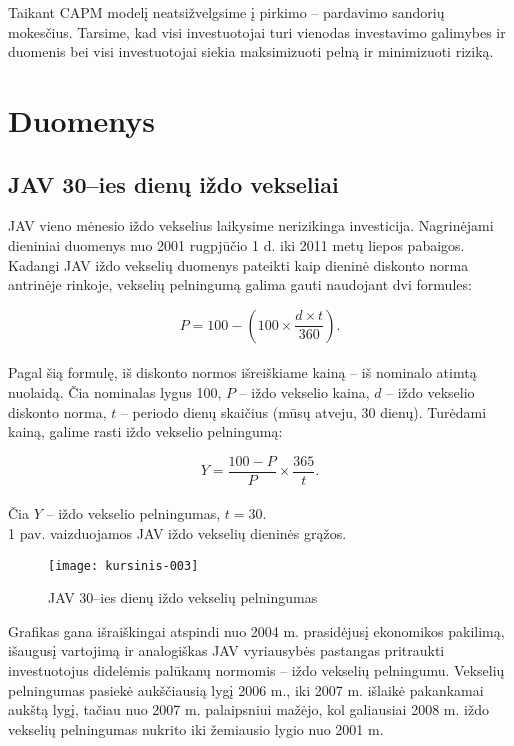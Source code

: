 \documentclass[12pt, a14paper, lithuanian]{article}
\begin{document}
Taikant CAPM modelį neatsižvelgsime į pirkimo -- pardavimo sandorių mokesčius. Tarsime, kad visi investuotojai turi vienodas investavimo galimybes ir duomenis bei visi investuotojai siekia maksimizuoti pelną ir minimizuoti riziką.



\newpage
\section{Duomenys}
\subsection{JAV 30--ies dienų iždo vekseliai}

JAV vieno mėnesio iždo vekselius laikysime nerizikinga investicija. Nagrinėjami dieniniai duomenys nuo 2001 rugpjūčio 1 d. iki 2011 metų liepos pabaigos\cite{tbills}.
Kadangi JAV iždo vekselių duomenys pateikti kaip dieninė diskonto norma antrinėje rinkoje, vekselių pelningumą galima gauti naudojant dvi formules:


$$P = 100 - \left( 100 \times \frac{d \times t}{360}\right) .$$\\

Pagal šią formulę, iš diskonto normos išreiškiame kainą -- iš nominalo atimtą nuolaidą. 
Čia nominalas lygus 100, $P$ -- iždo vekselio kaina, $d$ -- iždo vekselio diskonto norma,
$t$ -- periodo dienų skaičius (mūsų atveju, 30 dienų). 
Turėdami kainą, galime rasti iždo vekselio pelningumą:

$$Y = \frac{100 - P}{P} \times \frac{365}{t}.$$\\

Čia  $Y$ -- iždo vekselio pelningumas, $t = 30$. \\

1 pav. vaizduojamos JAV iždo vekselių dieninės grąžos.
   
\begin{figure}[H]
  \centering
\texttt{[image: kursinis-003]}
  \caption{JAV 30--ies dienų iždo vekselių pelningumas}
  \label{fig:1}
\end{figure}

Grafikas gana išraiškingai atspindi nuo 2004 m. prasidėjusį ekonomikos pakilimą, išaugusį vartojimą ir analogiškas
JAV vyriausybės pastangas pritraukti investuotojus didelėmis palūkanų normomis -- iždo vekselių pelningumu.
Vekselių pelningumas pasiekė aukščiausią lygį 2006 m., iki 2007 m. išlaikė pakankamai aukštą lygį, tačiau nuo 2007 m.
palaipsniui mažėjo, kol galiausiai 2008 m. iždo vekselių pelningumas nukrito iki žemiausio lygio nuo 2001 m. \\
\end{document}
